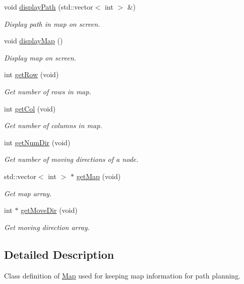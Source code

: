 \begin{DoxyCompactItemize}
void \hyperlink{classMap_a4358aea9eb9f207aae23fc8d9a40b97a}{display\-Path} (std\-::vector$<$ int $>$ \&)
\begin{DoxyCompactList}\small\item\em Display path in map on screen. \end{DoxyCompactList}\item 
void \hyperlink{classMap_ac5af28a5fed55d9ca5d1dab5cb9f3f9c}{display\-Map} ()
\begin{DoxyCompactList}\small\item\em Display map on screen. \end{DoxyCompactList}\item 
int \hyperlink{classMap_a80e0ea134ccb9a22092ce4c520063cd2}{get\-Row} (void)
\begin{DoxyCompactList}\small\item\em Get number of rows in map. \end{DoxyCompactList}\item 
int \hyperlink{classMap_a88d24c08a4669040d7de6bd5f6272862}{get\-Col} (void)
\begin{DoxyCompactList}\small\item\em Get number of columns in map. \end{DoxyCompactList}\item 
int \hyperlink{classMap_a04501949c81ac8dd6a7aeaca908fe969}{get\-Num\-Dir} (void)
\begin{DoxyCompactList}\small\item\em Get number of moving directions of a node. \end{DoxyCompactList}\item 
std\-::vector$<$ int $>$ $\ast$ \hyperlink{classMap_ad5c4312f11909eafc091715686b6ceda}{get\-Map} (void)
\begin{DoxyCompactList}\small\item\em Get map array. \end{DoxyCompactList}\item 
int $\ast$ \hyperlink{classMap_a4f9142718a50c64152465aacc1033f26}{get\-Move\-Dir} (void)
\begin{DoxyCompactList}\small\item\em Get moving direction array. \end{DoxyCompactList}\end{DoxyCompactItemize}


\subsection{Detailed Description}
Class definition of \hyperlink{classMap}{Map} used for keeping map information for path planning. 


